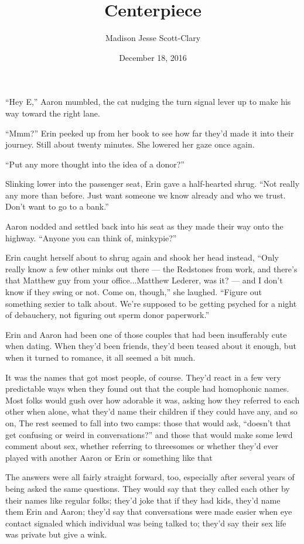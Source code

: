\documentclass[12pt,letterpaper,oneside]{memoir}
\title{Centerpiece}
\author{Madison Jesse Scott-Clary}
\date{December 18, 2016}
\begin{document}
  \maketitle

  ``Hey E,'' Aaron mumbled, the cat nudging the turn signal lever up to make his way toward the right lane.

  ``Mmm?'' Erin peeked up from her book to see how far they'd made it into their journey. Still about twenty minutes. She lowered her gaze once again.

  ``Put any more thought into the idea of a donor?''

  Slinking lower into the passenger seat, Erin gave a half-hearted shrug. ``Not really any more than before. Just want someone we know already and who we trust. Don't want to go to a bank.''

  Aaron nodded and settled back into his seat as they made their way onto the highway. ``Anyone you can think of, minkypie?''

  Erin caught herself about to shrug again and shook her head instead, ``Only really know a few other minks out there --- the Redstones from work, and there's that Matthew guy from your office...Matthew Lederer, was it? --- and I don't know if they swing or not. Come on, though,'' she laughed. ``Figure out something sexier to talk about. We're supposed to be getting psyched for a night of debauchery, not figuring out sperm donor paperwork.''

  Erin and Aaron had been one of those couples that had been insufferably cute when dating. When they'd been friends, they'd been teased about it enough, but when it turned to romance, it all seemed a bit much.

  It was the names that got most people, of course. They'd react in a few very predictable ways when they found out that the couple had homophonic names. Most folks would gush over how adorable it was, asking how they referred to each other when alone, what they'd name their children if they could have any, and so on, The rest seemed to fall into two camps: those that would ask, ``doesn't that get confusing or weird in conversations?'' and those that would make some lewd comment about sex, whether referring to threesomes or whether they'd ever played with another Aaron or Erin or something like that

  The answers were all fairly straight forward, too, especially after several years of being asked the same questions. They would say that they called each other by their names like regular folks; they'd joke that if they had kids, they'd name them Erin and Aaron; they'd say that conversations were made easier when eye contact signaled which individual was being talked to; they'd say their sex life was private but give a wink.
\end{document}
